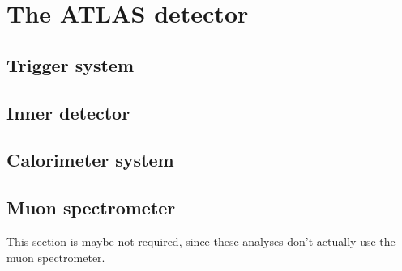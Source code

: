 \section{The ATLAS detector}
\label{sec:atlas}

\subsection{Trigger system}
\subsection{Inner detector}
\subsection{Calorimeter system}
\subsection{Muon spectrometer}
This section is maybe not required, since these analyses don't actually use the muon spectrometer.

